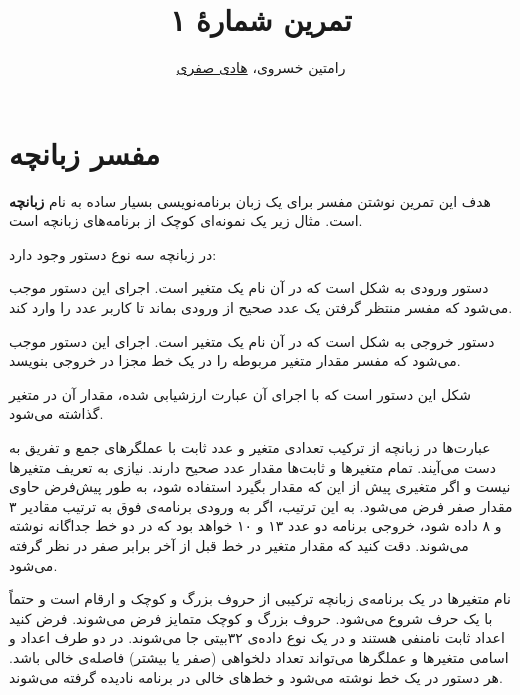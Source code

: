 \documentclass{utap}
\title{تمرین شماره‌ٔ ۱}
\author{رامتین خسروی، \href{mailto:hadi.safari@ut.ac.ir?subject=[AP\%20S98 A1]\%20}{هادی صفری}}
\begin{document}
	\maketitle
	
	\section{مفسر زبانچه}
	
	هدف این تمرین نوشتن مفسر برای یک زبان برنامه‌نویسی بسیار ساده به نام \textbf{زبانچه} است. مثال زیر یک نمونه‌ای کوچک از برنامه‌های زبانچه است.
	
	\begin{latin}
		
	\end{latin}
	
	در زبانچه سه نوع دستور وجود دارد:
	
	\begin{description}[leftmargin=6em,style=nextline,font=\labelitemi\quad\bfseries]
		\item[ورودی]
		دستور ورودی به شکل  است که در آن  نام یک متغیر است. اجرای این دستور موجب می‌شود که مفسر منتظر گرفتن یک عدد صحیح از ورودی بماند تا کاربر عدد را وارد کند.
		\item[خروجی]
		دستور خروجی به شکل  است که در آن  نام یک متغیر است. اجرای این دستور موجب می‌شود که مفسر مقدار متغیر مربوطه را در یک خط مجزا در خروجی بنویسد.
		\item[جایگزینی]
		شکل این دستور  است که با اجرای آن عبارت  ارزشیابی شده، مقدار آن در متغیر  گذاشته می‌شود.
	\end{description}
	
	عبارت‌ها در زبانچه از ترکیب تعدادی متغیر و عدد ثابت با عملگرهای جمع و تفریق به دست می‌آیند. تمام متغیرها و ثابت‌ها مقدار عدد صحیح دارند. نیازی به تعریف متغیرها نیست و اگر متغیری پیش از این که مقدار بگیرد استفاده شود، به طور پیش‌فرض حاوی مقدار صفر فرض می‌شود. به این ترتیب، اگر به ورودی برنامه‌ی فوق به ترتیب مقادیر ۳ و ۸ داده شود، خروجی برنامه دو عدد ۱۳ و ۱۰ خواهد بود که در دو خط جداگانه نوشته می‌شوند. دقت کنید که مقدار متغیر  در خط قبل از آخر برابر صفر در نظر گرفته می‌شود.
	
	نام متغیرها در یک برنامه‌ی زبانچه ترکیبی از حروف بزرگ و کوچک و ارقام است و حتماً با یک حرف شروع می‌شود. حروف بزرگ و کوچک متمایز فرض می‌شوند. فرض کنید اعداد ثابت نامنفی هستند و در یک نوع داده‌ی ۳۲‌بیتی جا می‌شوند. در دو طرف اعداد و اسامی متغیرها و عملگرها می‌تواند تعداد دلخواهی (صفر یا بیشتر) فاصله‌ی خالی باشد. هر دستور در یک خط نوشته می‌شود و خط‌های خالی در برنامه نادیده گرفته می‌شوند.
	
\end{document}
